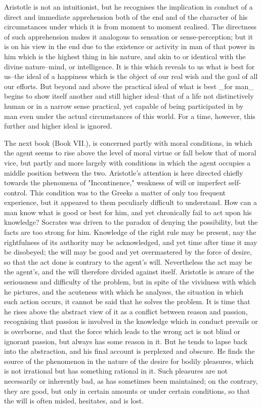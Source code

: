 Aristotle is not an intuitionist, but he recognises the implication in
conduct of a direct and immediate apprehension both of the end and of
the character of his circumstances under which it is from moment to
moment realised. The directness of such apprehension makes it analogous
to sensation or sense-perception; but it is on his view in the end due
to the existence or activity in man of that power in him which is the
highest thing in his nature, and akin to or identical with the divine
nature--mind, or intelligence. It is this which reveals to us what is
best for us--the ideal of a happiness which is the object of our real
wish and the goal of all our efforts. But beyond and above the practical
ideal of what is best _for man_ begins to show itself another and still
higher ideal--that of a life not distinctively human or in a narrow
sense practical, yet capable of being participated in by man even under
the actual circumstances of this world. For a time, however, this
further and higher ideal is ignored.

The next book (Book VII.), is concerned partly with moral conditions, in
which the agent seems to rise above the level of moral virtue or fall
below that of moral vice, but partly and more largely with conditions in
which the agent occupies a middle position between the two. Aristotle's
attention is here directed chiefly towards the phenomena of
"Incontinence," weakness of will or imperfect self-control. This
condition was to the Greeks a matter of only too frequent experience,
but it appeared to them peculiarly difficult to understand. How can a
man know what is good or best for him, and yet chronically fail to act
upon his knowledge? Socrates was driven to the paradox of denying the
possibility, but the facts are too strong for him. Knowledge of the
right rule may be present, nay the rightfulness of its authority may be
acknowledged, and yet time after time it may be disobeyed; the will may
be good and yet overmastered by the force of desire, so that the act
done is contrary to the agent's will. Nevertheless the act may be the
agent's, and the will therefore divided against itself. Aristotle is
aware of the seriousness and difficulty of the problem, but in spite of
the vividness with which he pictures, and the acuteness with which he
analyses, the situation in which such action occurs, it cannot be said
that he solves the problem. It is time that he rises above the abstract
view of it as a conflict between reason and passion, recognising that
passion is involved in the knowledge which in conduct prevails or is
overborne, and that the force which leads to the wrong act is not blind
or ignorant passion, but always has some reason in it. But he tends to
lapse back into the abstraction, and his final account is perplexed and
obscure. He finds the source of the phenomenon in the nature of the
desire for bodily pleasures, which is not irrational but has something
rational in it. Such pleasures are not necessarily or inherently bad, as
has sometimes been maintained; on the contrary, they are good, but only
in certain amounts or under certain conditions, so that the will is
often misled, hesitates, and is lost.


